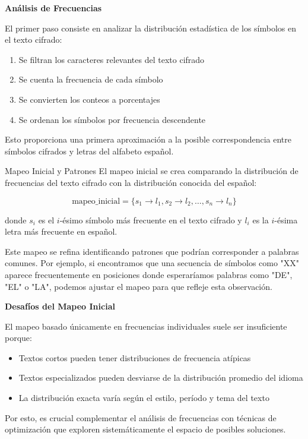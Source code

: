 \begin{securitygoodpractice}
\textbf{Análisis de Frecuencias}

El primer paso consiste en analizar la distribución estadística de los símbolos en el texto cifrado:

\begin{enumerate}
    \item Se filtran los caracteres relevantes del texto cifrado
    \item Se cuenta la frecuencia de cada símbolo
    \item Se convierten los conteos a porcentajes
    \item Se ordenan los símbolos por frecuencia descendente
\end{enumerate}

Esto proporciona una primera aproximación a la posible correspondencia entre símbolos cifrados y letras del alfabeto español.
\end{securitygoodpractice}

\begin{cryptoanalysis}{Mapeo Inicial y Patrones}
El mapeo inicial se crea comparando la distribución de frecuencias del texto cifrado con la distribución conocida del español:

$$\text{mapeo\_inicial} = \{s_1 \rightarrow l_1, s_2 \rightarrow l_2, \ldots, s_n \rightarrow l_n\}$$

donde $s_i$ es el $i$-ésimo símbolo más frecuente en el texto cifrado y $l_i$ es la $i$-ésima letra más frecuente en español.

Este mapeo se refina identificando patrones que podrían corresponder a palabras comunes. Por ejemplo, si encontramos que una secuencia de símbolos como "XX" aparece frecuentemente en posiciones donde esperaríamos palabras como "DE", "EL" o "LA", podemos ajustar el mapeo para que refleje esta observación.
\end{cryptoanalysis}

\begin{securityalert}
\textbf{Desafíos del Mapeo Inicial}

El mapeo basado únicamente en frecuencias individuales suele ser insuficiente porque:

\begin{itemize}
    \item Textos cortos pueden tener distribuciones de frecuencia atípicas
    \item Textos especializados pueden desviarse de la distribución promedio del idioma
    \item La distribución exacta varía según el estilo, período y tema del texto
\end{itemize}

Por esto, es crucial complementar el análisis de frecuencias con técnicas de optimización que exploren sistemáticamente el espacio de posibles soluciones.
\end{securityalert}

